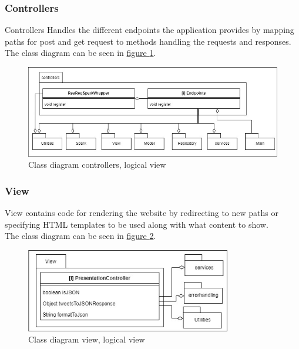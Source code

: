 \subsubsection{Controllers}
Controllers Handles the different endpoints the application provides by mapping paths for post and get request to methods handling the requests and responses.\\
The class diagram can be seen in \hyperref[fig:classDiagramControllers]{figure \ref{fig:classDiagramControllers}}.
\begin{figure}[H]
    \centering
    \includegraphics[width=1.0\textwidth]{images/class_diagram_controllers.jpg}
    \caption{Class diagram controllers, logical view}
    \label{fig:classDiagramControllers}
\end{figure}

\subsubsection{View}
View contains code for rendering the website by redirecting to new paths or specifying HTML templates to be used along with what content to show.\\
The class diagram can be seen in \hyperref[fig:classDiagramView]{figure \ref{fig:classDiagramView}}.
\begin{figure}[H]
    \centering
    \includegraphics[width=0.8\textwidth]{images/class_diagram_view.jpg}
    \caption{Class diagram view, logical view}
    \label{fig:classDiagramView}
\end{figure}

